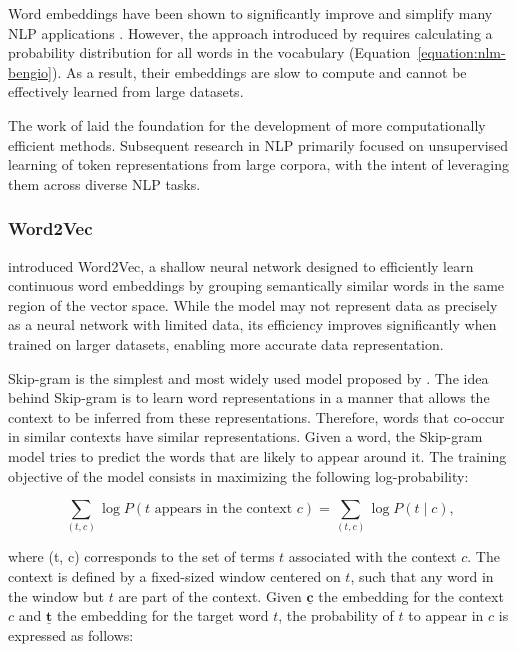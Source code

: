 Word embeddings have been shown to significantly improve and simplify many \ac{NLP} applications \citep{collobert2011natural}. However, the approach introduced by \citet{bengio2000neural} requires calculating a probability distribution for all words in the vocabulary (Equation~\ref{equation:nlm-bengio}). As a result, their embeddings are slow to compute and cannot be effectively learned from large datasets. 

The work of \citet{bengio2000neural} laid the foundation for the development of more computationally efficient methods. Subsequent research in \ac{NLP} primarily focused on unsupervised learning of token representations from large corpora, with the intent of leveraging them across diverse \ac{NLP} tasks.



\subsubsection{Word2Vec}

\citet{mikolov2013efficient} introduced Word2Vec, a shallow neural network designed to efficiently learn continuous word embeddings by grouping semantically similar words in the same region of the vector space. While the model may not represent data as precisely as a neural network with limited data, its efficiency improves significantly when trained on larger datasets, enabling more accurate data representation. 

Skip-gram is the simplest and most widely used model proposed by \citet{mikolov2013efficient}. The idea behind Skip-gram is to learn word representations in a manner that allows the context to be inferred from these representations. Therefore, words that co-occur in similar contexts have similar representations. Given a word, the Skip-gram model tries to predict the words that are likely to appear around it. The training objective of the model consists in maximizing the following log-probability:

\begin{equation}
    \sum_{(t, c)} \log P(t \text{ appears in the context } c) = \sum_{(t, c)} \log P(t \mid c),
\end{equation}

\noindent where (t, c) corresponds to the set of terms $t$ associated with the context $c$. The context is defined by a fixed-sized window centered on $t$, such that any word in the window but $t$ are part of the context. Given $\bm{\underline{c}}$ the embedding for the context $c$ and $\bm{\underline{t}}$ the embedding for the target word $t$, the probability of $t$ to appear in $c$ is expressed as follows:

